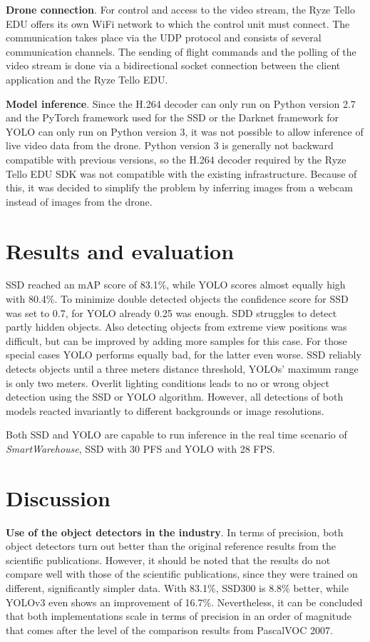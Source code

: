 \documentclass[a4paper, 10pt, journal]{wissarbIEEE}      %
\begin{document}
\textbf{Drone connection}. For control and access to the video stream, the Ryze Tello EDU offers its own WiFi network to which the control unit must connect. The communication takes place via the UDP protocol and consists of several communication channels. The sending of flight commands and the polling of the video stream is done via a bidirectional socket connection between the client application and the Ryze Tello EDU.

\textbf{Model inference}. Since the H.264 decoder can only run on Python version 2.7 and the PyTorch framework used for the SSD or the Darknet framework for YOLO can only run on Python version 3, it was not possible to allow inference of live video data from the drone. Python version 3 is generally not backward compatible with previous versions, so the H.264 decoder required by the Ryze Tello EDU SDK was not compatible with the existing infrastructure. Because of this, it was decided to simplify the problem by inferring images from a webcam instead of images from the drone.

\section{Results and evaluation} \label{evaluation}

SSD reached an mAP score of 83.1\%, while YOLO scores almost equally high with 80.4\%. To minimize double detected objects the confidence score for SSD was set to 0.7, for YOLO already 0.25 was enough. SDD struggles to detect partly hidden objects. Also detecting objects from extreme view positions was difficult, but can be improved by adding more samples for this case. For those special cases YOLO performs equally bad, for the latter even worse. SSD reliably detects objects until a three meters distance threshold, YOLOs' maximum range is only two meters. Overlit lighting conditions leads to no or wrong object detection using the SSD or YOLO algorithm. However, all detections of both models reacted invariantly to different backgrounds or image resolutions. 

Both SSD and YOLO are capable to run inference in the real time scenario of \textit{SmartWarehouse}, SSD with 30 PFS and YOLO with 28 FPS. 

\section{Discussion} \label{discussion}

\textbf{Use of the object detectors in the industry}. In terms of precision, both object detectors turn out better than the original reference results from the scientific publications. However, it should be noted that the results do not compare well with those of the scientific publications, since they were trained on different, significantly simpler data. With 83.1\%, SSD300 is 8.8\% better, while YOLOv3 even shows an improvement of 16.7\%. Nevertheless, it can be concluded that both implementations scale in terms of precision in an order of magnitude that comes after the level of the comparison results from PascalVOC 2007.
\end{document}
